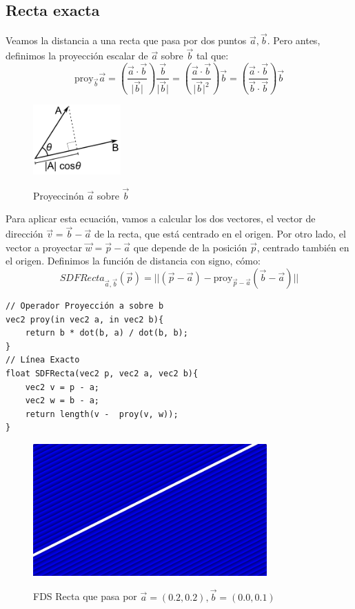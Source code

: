 \subsection{Recta exacta}
Veamos la distancia a una recta que pasa por dos puntos \(\Vec{a},\Vec{b}\). Pero antes, definimos la proyección escalar de \(\Vec{a}\) sobre \(\Vec{b}\) tal que:
\[ \text{proy}_{\Vec{b}}\Vec{a}=\left(\dfrac{\Vec{a}\cdot\Vec{b}}{\vert \Vec{b}\vert}\right)\dfrac{\Vec{b}}{\vert\Vec{b}\vert}=\left(\dfrac{\Vec{a}\cdot\Vec{b}}{\vert \Vec{b}\vert^2}\right)\Vec{b}=\left(\dfrac{\Vec{a}\cdot \Vec{b}}{\Vec{b}\cdot \Vec{b}}\right)\Vec{b}\]

\begin{figure}[H]
  \centering
  \captionsetup{justification=centering}%
  \includegraphics[width=0.3\textwidth]{secciones/imagenes/proyeccion.png}\label{fig:proyection}
  \caption{Proyeccinón \(\Vec{a}\) sobre \(\Vec{b}\)}
\end{figure}
Para aplicar esta ecuación, vamos a calcular los dos vectores, el vector de dirección \(\Vec{v}=\Vec{b}-\Vec{a}\) de la recta, que está centrado en el origen. Por otro lado, el vector a proyectar \(\Vec{w}=\Vec{p}-\Vec{a}\) que depende de la posición \(\Vec{p}\), centrado también en el origen. Definimos la función de distancia con signo, cómo:
\[SDFRecta_{\Vec{a},\Vec{b}}(\Vec{p})=\vert\vert (\Vec{p}-\Vec{a}) - \text{proy}_{\Vec{p}-\Vec{a}}\left(\Vec{b}-\Vec{a}\right)\vert\vert\]

\begin{lstlisting}
// Operador Proyección a sobre b
vec2 proy(in vec2 a, in vec2 b){
    return b * dot(b, a) / dot(b, b);
}
// Línea Exacto
float SDFRecta(vec2 p, vec2 a, vec2 b){
    vec2 v = p - a;
    vec2 w = b - a;
    return length(v -  proy(v, w));
}
\end{lstlisting}
\begin{figure}[H]
  \centering
  \captionsetup{justification=centering}%
  \includegraphics[width=0.8\textwidth]{secciones/imagenes/sdf/2d/sdf_recta.png}\label{fig:recta}
  \caption{FDS Recta que pasa por \(\Vec{a}=(0.2, 0.2), \Vec{b}=(0.0, 0.1)\)}
\end{figure}

